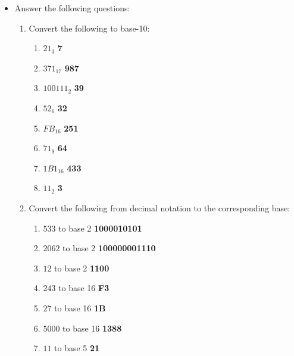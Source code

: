 \documentclass[10pt]{article}
\begin{document}
\begin{itemize}

\setlength\itemsep{10mm}


\item Answer the following questions:



  \begin{enumerate}
\setlength\itemsep{5mm}
\item Convert the following to base-10:
\begin{enumerate}[label=\Alph*]

\item $21_3$   \textbf{7}

\item $371_{17}$ \textbf{987}

\item $100111_2$ \textbf{39}

\item $52_6$ \textbf{32}

\item $FB_{16}$ \textbf{251}

\item $71_9$ \textbf{64}

\item $1B1_{16}$ \textbf{433}

\item $11_2$ \textbf{3}

\end{enumerate}

\item Convert the following from decimal notation to the corresponding base:
\begin{enumerate}[label=\Alph*]


\item $533$ to base 2   \textbf{1000010101}

\item $2062$ to base 2   \textbf{100000001110}

\item $12$ to base 2   \textbf{1100}

\item $243$ to base 16  \textbf{F3}

\item $27$ to base 16   \textbf{1B}

\item $5000$ to base 16   \textbf{1388}

\item $11$ to base 5   \textbf{21}


\end{enumerate}
\end{enumerate}
\end{itemize}
\end{document}
